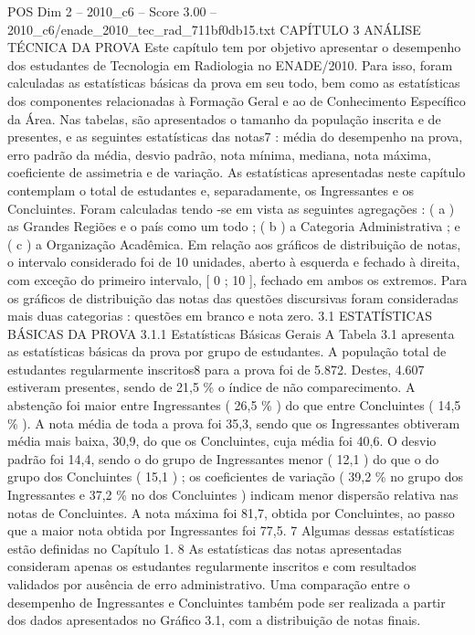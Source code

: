 \begin{textsample}{POS Dim 2 – 2010\_c6 – Score 3.00 – 2010\_c6/enade\_2010\_tec\_rad\_711bf0db15.txt}  \label{ex:f2_pos_181}
CAPÍTULO 3 ANÁLISE TÉCNICA DA PROVA Este capítulo tem por objetivo apresentar o desempenho dos estudantes de Tecnologia em Radiologia no ENADE/2010.
Para isso, foram calculadas as estatísticas básicas da prova em seu todo, bem como as estatísticas dos componentes relacionadas à Formação Geral e ao de Conhecimento Específico da Área.
Nas tabelas, são apresentados o tamanho da população inscrita e de presentes, e as seguintes estatísticas das notas7 : média do desempenho na prova, erro padrão da média, desvio padrão, nota mínima, mediana, nota máxima, coeficiente de assimetria e de variação.
As estatísticas apresentadas neste capítulo contemplam o total de estudantes e, separadamente, os Ingressantes e os Concluintes.
Foram calculadas tendo -se em vista as seguintes agregações : ( a ) as Grandes Regiões e o país como um todo ; ( b ) a Categoria Administrativa ; e ( c ) a Organização Acadêmica.
Em relação aos gráficos de distribuição de notas, o intervalo considerado foi de 10 unidades, aberto à esquerda e fechado à direita, com exceção do primeiro intervalo, [ 0 ; 10 ], fechado em ambos os extremos.
Para os gráficos de distribuição das notas das questões discursivas foram consideradas mais duas categorias : questões em branco e nota zero. 3.1 ESTATÍSTICAS BÁSICAS DA PROVA 3.1.1 Estatísticas Básicas Gerais A Tabela 3.1 apresenta as estatísticas básicas da prova por grupo de estudantes.
A população total de estudantes regularmente inscritos8 para a prova foi de 5.872.
Destes, 4.607 estiveram presentes, sendo de 21,5 \% o índice de não comparecimento.
A abstenção foi maior entre Ingressantes ( 26,5 \% ) do que entre Concluintes ( 14,5 \% ).
A nota média de toda a prova foi 35,3, sendo que os Ingressantes obtiveram média mais baixa, 30,9, do que os Concluintes, cuja média foi 40,6.
O desvio padrão foi 14,4, sendo o do grupo de Ingressantes menor ( 12,1 ) do que o do grupo dos Concluintes ( 15,1 ) ; os coeficientes de variação ( 39,2 \% no grupo dos Ingressantes e 37,2 \% no dos Concluintes ) indicam menor dispersão relativa nas notas de Concluintes.
A nota máxima foi 81,7, obtida por Concluintes, ao passo que a maior nota obtida por Ingressantes foi 77,5. 7 Algumas dessas estatísticas estão definidas no Capítulo 1. 8 As estatísticas das notas apresentadas consideram apenas os estudantes regularmente inscritos e com resultados validados por ausência de erro administrativo.
Uma comparação entre o desempenho de Ingressantes e Concluintes também pode ser realizada a partir dos dados apresentados no Gráfico 3.1, com a distribuição de notas finais.

\end{textsample}
